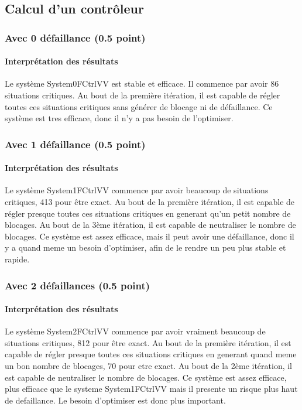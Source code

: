 \documentclass[a4paper]{book}
\begin{document}
\subsection{Calcul d'un contrôleur}
\subsubsection{Avec 0 défaillance (0.5 point)}

\paragraph{Interprétation des résultats}
Le système System0FCtrlVV est stable et efficace. Il commence par avoir 86
situations critiques. Au bout de la première itération, il est capable de
régler toutes ces situations critiques sans générer de blocage ni de défaillance.
Ce système est tres efficace, donc il n'y a pas besoin de l'optimiser.

\subsubsection{Avec 1 défaillance (0.5 point)}

\paragraph{Interprétation des résultats}
Le système System1FCtrlVV commence par avoir beaucoup de situations critiques, 413 pour
être exact. Au bout de la première itération, il est capable de régler presque toutes ces
situations critiques en generant qu'un petit nombre de blocages. Au bout de la 3ème itération,
il est capable de neutraliser le nombre de blocages. Ce système est assez efficace, mais il
peut avoir une défaillance, donc il y a quand meme un besoin d'optimiser, afin de le rendre
un peu plus stable et rapide.


\subsubsection{Avec 2 défaillances (0.5 point)}

\paragraph{Interprétation des résultats}
Le système System2FCtrlVV commence par avoir vraiment beaucoup de situations critiques, 812 pour être
exact. Au bout de la première itération, il est capable de régler presque toutes ces situations critiques
en generant quand meme un bon nombre de blocages, 70 pour etre exact. Au bout de la 2ème itération,
il est capable de neutraliser le nombre de blocages. Ce système est assez efficace, plus efficace
que le systeme System1FCtrlVV mais il presente un risque plus haut de defaillance. Le besoin
d'optimiser est donc plus important.
\end{document}
